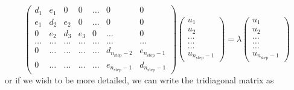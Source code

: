 \documentclass[11pt,a4wide]{article}
\begin{document}
\begin{equation}
    \left( \begin{array}{ccccccc} d_1 & e_1 & 0   & 0    & \dots  &0     & 0 \\
                                e_1 & d_2 & e_2 & 0    & \dots  &0     &0 \\
                                0   & e_2 & d_3 & e_3  &0       &\dots & 0\\
                                \dots  & \dots & \dots & \dots  &\dots      &\dots & \dots\\
                                0   & \dots & \dots & \dots  &\dots       &d_{n_{\mathrm{step}}-2} & e_{n_{\mathrm{step}}-1}\\
                                0   & \dots & \dots & \dots  &\dots       &e_{n_{\mathrm{step}}-1} & d_{n_{\mathrm{step}}-1}

             \end{array} \right)      \left( \begin{array}{c} u_{1} \\
                                                              u_{2} \\
                                                              \dots\\ \dots\\ \dots\\
                                                              u_{n_{\mathrm{step}}-1}
             \end{array} \right)=\lambda \left( \begin{array}{c} u_{1} \\
                                                              u_{2} \\
                                                              \dots\\ \dots\\ \dots\\
                                                              u_{n_{\mathrm{step}}-1}
             \end{array} \right) 
      \label{eq:sematrix}
\end{equation} 
or if we wish to be more detailed, we can write the tridiagonal matrix as
\end{document}
